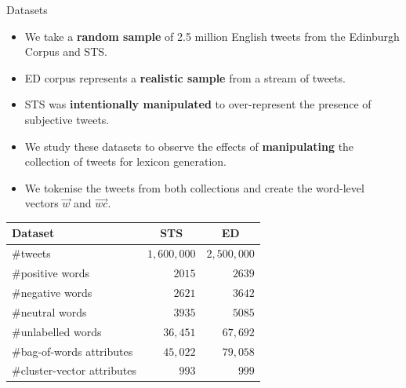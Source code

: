 \documentclass[handout]{beamer}
\begin{document}
\begin{frame}{Datasets}

\begin{scriptsize}
\begin{itemize}
\item We take a \textbf{random sample} of 2.5 million English tweets from the Edinburgh Corpus and STS.
\item  ED corpus represents a \textbf{realistic sample} from a stream of tweets.
\item  STS was \textbf{intentionally manipulated} to over-represent the presence of subjective tweets. 
\item We study these datasets to observe the effects of \textbf{manipulating} the collection of tweets for lexicon generation. 
\item We tokenise the tweets from both collections and create the word-level vectors $\overrightarrow{w}$ and $\overrightarrow{wc}$.
\end{itemize}
\end{scriptsize}

\begin{table}[htbp]
\scriptsize
\begin{center}
\begin{tabular}{ l|r|r}
\hline \hline
Dataset & \multicolumn{1}{c|}{STS} & \multicolumn{1}{c}{ED} \\ \hline 
\#tweets & $1,600,000$ & $2,500,000$ \\ 
\#positive words & $2015$ & $2639$ \\ 
\#negative words & $2621$ & $3642$ \\ 
\#neutral words & $3935$ & $5085$ \\ 
\#unlabelled words & $36,451$ & $67,692$ \\ 
\#bag-of-words attributes & $45,022$ & $79,058$ \\ 
\#cluster-vector attributes & $993$ & $999$ \\ \hline \hline
\end{tabular}
\end{center}
\label{tab:corpstats}
\end{table}
\end{frame}
\end{document}
